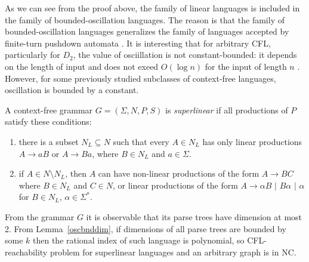 As we can see from the proof above, the family of linear languages is included in the family of bounded-oscillation languages. The reason is that the family of bounded-oscillation languages generalizes the family of languages accepted by finite-turn pushdown automata \cite{BoundOsc}. It is interesting that for arbitrary CFL, particularly for $D_2$, the value of osciillation is not constant-bounded: it depends on the length of input and does not exeed $O(\log n)$ for the input of length $n$ \cite*{Gundermann, Wechsung}. However, for some previously studied subclasses of context-free languages,  oscillation is bounded by a constant.

\begin{example} A context-free grammar $G = (\Sigma, N, P, S)$ is \textit{superlinear} if all productions of $P$ satisfy these conditions:
\begin{enumerate}
\item there is a subset $N_L \subseteq N$ such that every $A \in N_L$ has only linear productions $A\rightarrow aB$ or $A\rightarrow Ba$, where $B \in N_L$ and $a \in \Sigma$.
\item if $A \in N \setminus N_L$, then $A$ can have non-linear productions of the form $A \rightarrow BC$ where $B\in N_L$ and $C \in N$, or linear productions of the form $A\rightarrow \alpha B$ $\vert$ $B \alpha$ $\vert$ $\alpha$ for $B \in N_L$, $\alpha \in \Sigma^*$.
\end{enumerate}
From the grammar $G$ it is observable that its parse trees have dimension at most 2. From 
Lemma~\ref{oscbnddim}, if dimensions of all parse trees are bounded by some $k$ then the rational index of such language is polynomial, so CFL-reachability problem for superlinear languages and an arbitrary graph is in NC. 
\end{example}
